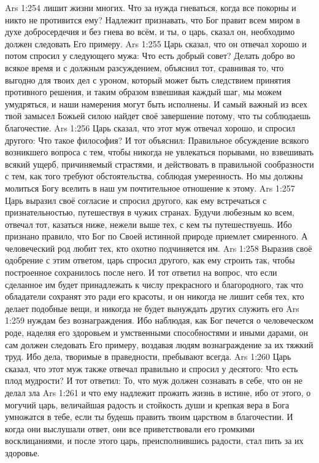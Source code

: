 \vs Ars 1:254
лишит жизни многих. Что за нужда гневаться, когда все покорны и никто не противится ему? Надлежит признавать, что Бог правит всем миром в духе добросердечия и без гнева во всём, и ты, о царь, сказал он, необходимо должен следовать Его примеру.
\vs Ars 1:255
Царь сказал, что он отвечал хорошо и потом спросил у следующего мужа: Что есть добрый совет? Делать добро во всякое время и с должным разсуждением, объяснил тот, сравнивая то, что выгодно для твоих дел с уроном, который может быть следствием принятия противного решения, и таким образом взвешивая каждый шаг, мы можем умудряться, и наши намерения могут быть исполнены. И самый важный из всех твой замысел Божьей силою найдет своё завершение потому, что ты соблюдаешь благочестие.
\vs Ars 1:256
Царь сказал, что этот муж отвечал хорошо, и спросил другого: Что такое философия? И тот объяснил: Правильное обсуждение всякого возникшего вопроса с тем, чтобы никогда не увлекаться порывами, но взвешивать всякий ущерб, причиняемый страстями, и действовать в правильной сообразности с тем, как того требуют обстоятельства, соблюдая умеренность. Но мы должны молиться Богу вселить в наш ум почтительное отношение к этому.
\vs Ars 1:257
Царь выразил своё согласие и спросил другого, как ему встречаться с признательностью, путешествуя в чужих странах. Будучи любезным ко всем, отвечал тот, казаться ниже, нежели выше тех, с кем ты путешествуешь. Ибо признано правило, что Бог по Своей истинной природе приемлет смиренного. А человеческий род любит тех, кто охотно подчиняется им.
\vs Ars 1:258
Выразив своё одобрение с этим ответом, царь спросил другого, как ему строить так, чтобы построенное сохранилось после него. И тот ответил на вопрос, что если сделанное им будет принадлежать к числу прекрасного и благородного, так что обладатели сохранят это ради его красоты, и он никогда не лишит себя тех, кто делает подобные вещи, и никогда не будет вынуждать других служить его
\vs Ars 1:259
нуждам без вознаграждения. Ибо наблюдая, как Бог печется о человеческом роде, наделяя его здоровьем и умственными способностями и иными дарами, он сам должен следовать Его примеру, воздавая людям вознаграждение за их тяжкий труд. Ибо дела, творимые в праведности, пребывают всегда.
\vs Ars 1:260
Царь сказал, что этот муж также отвечал правильно и спросил у десятого: Что есть плод мудрости? И тот ответил: То, что муж должен сознавать в себе, что он не делал зла
\vs Ars 1:261
и что ему надлежит прожить жизнь в истине, ибо от этого, о могучий царь, величайшая радость и стойкость души и крепкая вера в Бога умножатся в тебе, если ты будешь править твоим царством в благочестии. И когда они выслушали ответ, они все приветствовали его громкими восклицаниями, и после этого царь, преисполнившись радости, стал пить за их здоровье.
